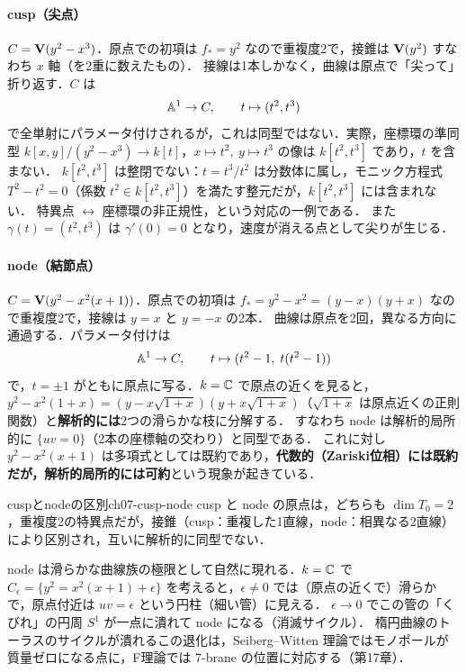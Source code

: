 \paragraph{cusp（尖点）}
$C=\mathbf{V}(y^2-x^3)$．原点での初項は $f_*=y^2$ なので重複度2で，接錐は $\mathbf{V}(y^2)$ すなわち $x$ 軸（を2重に数えたもの）．
接線は1本しかなく，曲線は原点で「尖って」折り返す．$C$ は
\[
  \mathbb{A}^1\to C,\qquad t\mapsto(t^2,t^3)
\]
で全単射にパラメータ付けされるが，これは同型ではない．実際，座標環の準同型 $k[x,y]/(y^2-x^3)\to k[t]$，$x\mapsto t^2,\ y\mapsto t^3$ の像は $k[t^2,t^3]$ であり，$t$ を含まない．
$k[t^2,t^3]$ は整閉でない：$t=t^3/t^2$ は分数体に属し，モニック方程式 $T^2-t^2=0$（係数 $t^2\in k[t^2,t^3]$）を満たす整元だが，$k[t^2,t^3]$ には含まれない．
特異点 $\leftrightarrow$ 座標環の非正規性，という対応の一例である．
また $\gamma(t)=(t^2,t^3)$ は $\gamma'(0)=0$ となり，速度が消える点として尖りが生じる．

\paragraph{node（結節点）}
$C=\mathbf{V}(y^2-x^2(x+1))$．原点での初項は $f_*=y^2-x^2=(y-x)(y+x)$ なので重複度2で，接線は $y=x$ と $y=-x$ の2本．
曲線は原点を2回，異なる方向に通過する．パラメータ付けは
\[
  \mathbb{A}^1\to C,\qquad t\mapsto(t^2-1,\;t(t^2-1))
\]
で，$t=\pm1$ がともに原点に写る．$k=\mathbb{C}$ で原点の近くを見ると，$y^2-x^2(1+x)=(y-x\sqrt{1+x})(y+x\sqrt{1+x})$（$\sqrt{1+x}$ は原点近くの正則関数）と\textbf{解析的には}2つの滑らかな枝に分解する．
すなわち node は解析的局所的に $\{uv=0\}$（2本の座標軸の交わり）と同型である．
これに対し $y^2-x^2(x+1)$ は多項式としては既約であり，\textbf{代数的（Zariski位相）には既約だが，解析的局所的には可約}という現象が起きている．

\begin{myprop}{cuspとnodeの区別}{ch07-cusp-node}
cusp と node の原点は，どちらも $\dim T_0=2$，重複度2の特異点だが，接錐（cusp：重複した1直線，node：相異なる2直線）により区別され，互いに解析的に同型でない．
\end{myprop}

\begin{physbox}[縮退するサイクルと特異ファイバー]
node は滑らかな曲線族の極限として自然に現れる．$k=\mathbb{C}$ で $C_\epsilon=\{y^2=x^2(x+1)+\epsilon\}$ を考えると，$\epsilon\neq0$ では（原点の近くで）滑らかで，原点付近は $uv=\epsilon$ という円柱（細い管）に見える．
$\epsilon\to0$ でこの管の「くびれ」の円周 $S^1$ が一点に潰れて node になる（消滅サイクル）．
楕円曲線のトーラスのサイクルが潰れるこの退化は，Seiberg–Witten 理論ではモノポールが質量ゼロになる点に，F理論では 7-brane の位置に対応する（第17章）．
\end{physbox}

